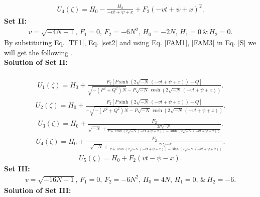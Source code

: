 \documentclass[10pt]{NSP1}
\numberwithin{equation}{section}
\begin{document}
\begin{eqnarray}\label{U4}
U_{4}\left(\zeta \right) =H_{0}-\frac{H_{2}}{-v t +\psi +x}+F_{2} \left(-v t +\psi +x \right)^{2}.
\end{eqnarray}
\textbf{Set II:}
\begin{eqnarray}\label{set2}
v = \sqrt{-4 N -1},\,F_{1} = 0,\,F_{2} = -6 N^{2},\, H_{0} = -2 N,\, H_{1} = 0\,{\&}\, H_{2} = 0.
\end{eqnarray}
By substituting Eq. \ref{TF1}, Eq. \ref{set2} and using Eq. \ref{FAM1}, \ref{FAM3} in Eq. \ref{S} we will get the following .\\
\textbf{Solution of Set II:}\\\
\begin{eqnarray}\label{U11}
U_{1}\! \left(\zeta \right) =H_{0}+\frac{F_{2} \left[P \sinh \! \left(2 \sqrt{-N}\, \left(-v t +\psi +x \right)\right)+Q \right]}{\sqrt{-\left(P^{2}+Q^{2}\right) N}-P \sqrt{-N}\, \cosh \! \left(2 \sqrt{-N}\, \left(-v t +\psi +x \right)\right)}.
\end{eqnarray}
\begin{eqnarray}\label{U22}
U_{2}\! \left(\zeta \right) =H_{0}+\frac{F_{2} \left[P \sinh \! \left(2 \sqrt{-N}\, \left(-v t +\psi +x \right)\right)+Q \right]}{-\sqrt{-\left(P^{2}+Q^{2}\right) N}-P \sqrt{-N}\, \cosh \! \left(2 \sqrt{-N}\, \left(-v t +\psi +x \right)\right)}.
\end{eqnarray}
\begin{eqnarray}\label{U33}
U_{3}\! \left(\zeta \right) =H_{0}+\frac{F_{2}}{\sqrt{-N}+\frac{2 P \sqrt{-N}}{P +\cosh \left(2 \sqrt{-N}\, \left(-v t +\psi +x \right)\right)-\sinh \left(2 \sqrt{-N}\, \left(-v t +\psi +x \right)\right)}}.
\end{eqnarray}
\begin{eqnarray}\label{U44}
U_{4}\! \left(\zeta \right) =H_{0}+\frac{F_{2}}{-\sqrt{-N}+\frac{2 P \sqrt{-N}}{P +\cosh \left(2 \sqrt{-N}\, \left(-v t +\psi +x \right)\right)-\sinh \left(2 \sqrt{-N}\, \left(-v t +\psi +x \right)\right)}}.
\end{eqnarray}
\begin{eqnarray}\label{U55}
U_{5}\! \left(\zeta \right) = H_{0}+F_{2} \left(v t -\psi -x \right).
\end{eqnarray}
\textbf{Set III:}
\begin{eqnarray}\label{set3}
v = \sqrt{-16 N -1},\,F_{1} = 0,\,F_{2} = -6 N^{2},\, H_{0} = 4 N,\, H_{1} = 0,\,{\&}\, H_{2} = -6.
\end{eqnarray}
\textbf{Solution of Set III:}\\
\end{document}
